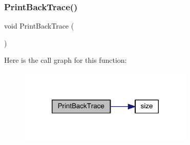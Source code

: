 \subsubsection{\texorpdfstring{Print\+Back\+Trace()}{PrintBackTrace()}}
{\footnotesize\ttfamily void Print\+Back\+Trace (\begin{DoxyParamCaption}{ }\end{DoxyParamCaption})}

Here is the call graph for this function\+:\nopagebreak
\begin{figure}[H]
\begin{center}
\leavevmode
\includegraphics[width=236pt]{a00077_aad9319a482c50504ad3d76158bfed8c7_cgraph}
\end{center}
\end{figure}
